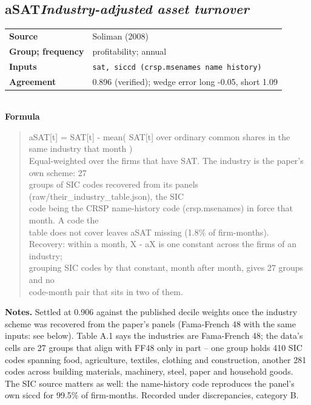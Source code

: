 \documentclass[11pt]{article}
\begin{document}
\subsection*{aSAT\quad\normalfont\itshape Industry-adjusted asset turnover}
\begin{tabular}{@{}p{3.3cm}p{12.3cm}@{}}
\textbf{Source} & Soliman (2008)\\
\textbf{Group; frequency} & profitability; annual\\
\textbf{Inputs} & \texttt{sat, siccd (crsp.msenames name history)}\\
\textbf{Agreement} & 0.896 (verified); wedge error long -0.05, short 1.09\\
\end{tabular}\\[4pt]
\textbf{Formula}
\begin{quote}\small
aSAT[t] = SAT[t] - mean( SAT[t] over ordinary common shares in the same industry that month )\\
Equal-weighted over the firms that have SAT. The industry is the paper's own scheme: 27\\
groups of SIC codes recovered from its panels (raw/their\_industry\_table.json), the SIC\\
code being the CRSP name-history code (crsp.msenames) in force that month. A code the\\
table does not cover leaves aSAT missing (1.8\% of firm-months).\\
Recovery: within a month, X - aX is one constant across the firms of an industry;\\
grouping SIC codes by that constant, month after month, gives 27 groups and no\\
code-month pair that sits in two of them.\\

\end{quote}
\textbf{Notes.} Settled at 0.906 against the published decile weights once the industry scheme was recovered from the paper's panels (Fama-French 48 with the same inputs: see below). Table A.1 says the industries are Fama-French 48; the data's cells are 27 groups that align with FF48 only in part -- one group holds 410 SIC codes spanning food, agriculture, textiles, clothing and construction, another 281 codes across building materials, machinery, steel, paper and household goods. The SIC source matters as well: the name-history code reproduces the panel's own siccd for 99.5\% of firm-months. Recorded under discrepancies, category B.
\end{document}
